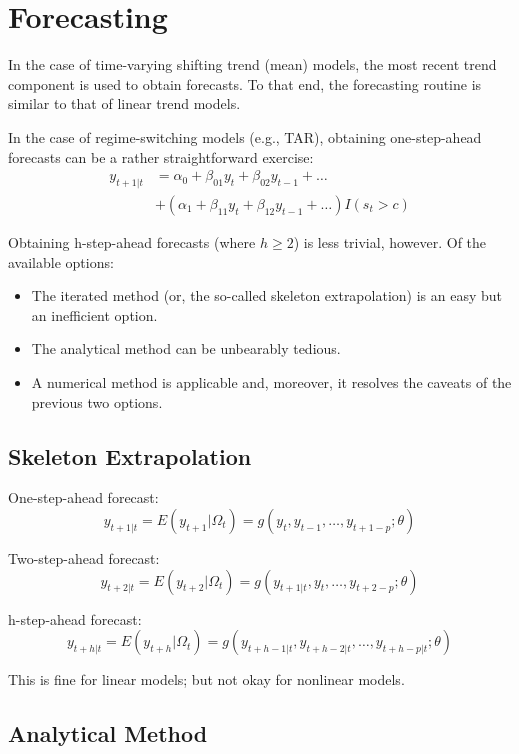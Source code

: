 \documentclass[
  oneside]{book}
\providecommand{\tightlist}{%
  \setlength{\itemsep}{0pt}\setlength{\parskip}{0pt}}
\begin{document}
\hypertarget{forecasting-4}{%
\section{Forecasting}\label{forecasting-4}}

In the case of time-varying shifting trend (mean) models, the most recent trend component is used to obtain forecasts. To that end, the forecasting routine is similar to that of linear trend models.

In the case of regime-switching models (e.g., TAR), obtaining one-step-ahead forecasts can be a rather straightforward exercise:
\[\begin{aligned}
y_{t+1|t} &= \alpha_0+\beta_{01}y_{t}+\beta_{02}y_{t-1}+\ldots \\
          &+ (\alpha_1+\beta_{11}y_{t}+\beta_{12}y_{t-1}+\ldots)I(s_t>c)
\end{aligned}\]

Obtaining h-step-ahead forecasts (where \(h\geq2\)) is less trivial, however. Of the available options:

\begin{itemize}
\tightlist
\item
  The iterated method (or, the so-called skeleton extrapolation) is an easy but an inefficient option.
\item
  The analytical method can be unbearably tedious.
\item
  A numerical method is applicable and, moreover, it resolves the caveats of the previous two options.
\end{itemize}

\hypertarget{skeleton-extrapolation}{%
\subsection{Skeleton Extrapolation}\label{skeleton-extrapolation}}

One-step-ahead forecast: \[y_{t+1|t} = E(y_{t+1}|\Omega_{t}) = g(y_{t},y_{t-1},\ldots,y_{t+1-p};\theta)\]

Two-step-ahead forecast: \[y_{t+2|t} = E(y_{t+2}|\Omega_{t}) = g(y_{t+1|t},y_{t},\ldots,y_{t+2-p};\theta)\]

h-step-ahead forecast: \[y_{t+h|t} = E(y_{t+h}|\Omega_{t}) = g(y_{t+h-1|t},y_{t+h-2|t},\ldots,y_{t+h-p|t};\theta)\]

This is fine for linear models; but not okay for nonlinear models.

\hypertarget{analytical-method}{%
\subsection{Analytical Method}\label{analytical-method}}
\end{document}
